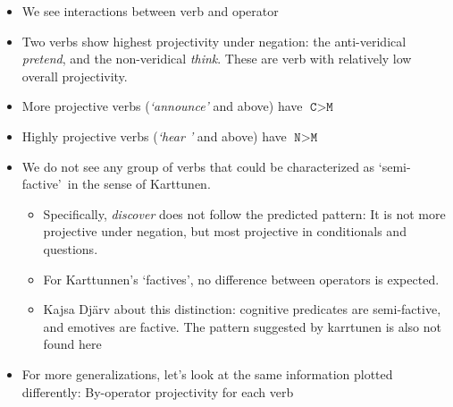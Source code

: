 \documentclass[10pt]{article}\usepackage[]{graphicx}\usepackage[]{color}
\begin{document}
\begin{itemize}
  \item We see interactions between verb and operator

  \item Two verbs show highest projectivity under negation: the anti-veridical \emph{pretend}, and the non-veridical \emph{think}. These are verb with relatively low overall projectivity.

  \item More projective verbs (\emph{\lq announce\rq} and above) have $\texttt{C} > \texttt{M}$

  \item Highly projective verbs (\emph{\lq hear \rq} and above) have  $\texttt{N} > \texttt{M}$

  \item We do not see any group of verbs that could be characterized as \lq semi-factive\rq\ in the sense of Karttunen.
  \begin{itemize}
    \item Specifically, \emph{discover} does not follow the predicted pattern: It is not more projective under negation, but most projective in conditionals and questions.
    \item For Karttunnen's \lq factives\rq, no difference between operators is expected.
    \item Kajsa Djärv about this distinction: cognitive predicates are semi-factive, and emotives are factive. The pattern suggested by karrtunen is also not found here
  \end{itemize}

  \item For more generalizations, let's look at the same information plotted differently: By-operator projectivity for each verb
\end{itemize}
\end{document}
